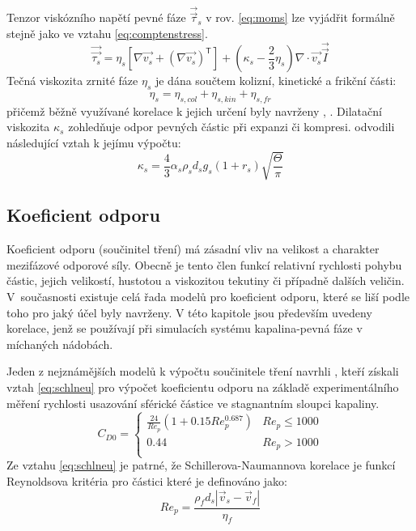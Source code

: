 Tenzor viskózního napětí pevné fáze $\vec{\vec{\tau}}_{s}$ v rov. \ref{eq:moms} lze vyjádřit formálně stejně jako ve vztahu \ref{eq:comptenstress}. 
\begin{equation}
	\vec{\vec{\tau_{s}}} = \eta_{s} \left[ \nabla \vec{v_{s}} +  \left( \nabla \vec{v_{s}} \right)^{\mathsf{T}}\right] +  \left( \kappa_{s} -\frac{2}{3} \eta_{s} \right) \nabla \cdot \vec{v_{s}} \vec{\vec{I}}
	\label{eq:solidstress}
\end{equation}
Tečná viskozita zrnité fáze $\eta_{s}$ je dána součtem kolizní, kinetické a frikční části:
\begin{equation}
	\eta_{s} = \eta_{s,col}  + \eta_{s,kin} + \eta_{s,fr} 
	\label{eq:nys}
\end{equation}
přičemž běžně využívané korelace k jejich určení byly navrženy \citet{gid92}, \citet{syam93}. Dilatační viskozita $\kappa_{s}$ zohledňuje odpor pevných částic při expanzi či kompresi. \citet{lun84} odvodili následující vztah k jejímu výpočtu:
\begin{equation}
	\kappa_{s} = \frac{4}{3}\alpha_{s}\rho_{s}d_{s}g_{s}\left(1 + r_{s} \right)\sqrt{\frac{\Theta}{\pi}}
	\label{eq:dilvis}
\end{equation}
 
\subsection{Koeficient odporu}
Koeficient odporu (součinitel tření) má zásadní vliv na velikost a charakter mezifázové odporové síly. Obecně je tento člen funkcí relativní rychlosti pohybu částic, jejich velikostí, hustotou a viskozitou tekutiny či případně dalších veličin. V~současnosti existuje celá řada modelů pro koeficient odporu, které se liší podle toho pro jaký účel byly navrženy. V této kapitole jsou především uvedeny korelace, jenž se používají při simulacích systému kapalina-pevná fáze v míchaných nádobách. 

Jeden z nejznámějších modelů k výpočtu součinitele tření navrhli \citet{schi32}, kteří získali vztah \ref{eq:schlneu} pro výpočet koeficientu odporu na základě experimentálního měření rychlosti usazování sférické částice ve stagnantním sloupci kapaliny.    
\begin{equation}
	\label{eq:schlneu}
  C_{D0} = \left\{ \begin{array}{ll}
  \frac{24}{Re_{p}}  \left( 1 + \num{0.15}Re_{p}^{\num{0.687}} \right) & Re_{p} \le 1000\\
  \num{0.44} & Re_{p} > 1000\\
  \end{array} \right.
\end{equation}
\noindent Ze vztahu \ref{eq:schlneu} je patrné, že Schillerova-Naumannova korelace je funkcí Reynoldsova kritéria pro částici které je definováno jako:
\begin{equation}
	Re_{p}= \frac{\rho_{f}d_{s}\left|\vec{v}_{s} - \vec{v}_{f}\right|}{\eta_{f}}
	\label{eq:reyp}
\end{equation}

